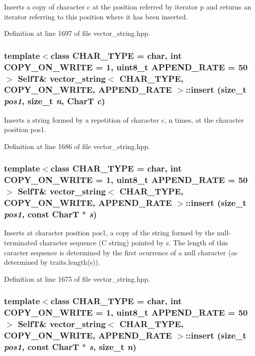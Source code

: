 Inserts a copy of character c at the position referred by iterator p and returns an iterator referring to this position where it has been inserted. 

Definition at line 1697 of file vector\_\-string.hpp.\hypertarget{classvector__string_c1a1bf0ea437e457a0b8a6ea543e5a7a}{
\subsubsection[{insert}]{\setlength{\rightskip}{0pt plus 5cm}template$<$class CHAR\_\-TYPE  = char, int COPY\_\-ON\_\-WRITE = 1, uint8\_\-t APPEND\_\-RATE = 50$>$ {\bf SelfT}\& {\bf vector\_\-string}$<$ CHAR\_\-TYPE, COPY\_\-ON\_\-WRITE, APPEND\_\-RATE $>$::insert (size\_\-t {\em pos1}, \/  size\_\-t {\em n}, \/  CharT {\em c})}}
\label{classvector__string_c1a1bf0ea437e457a0b8a6ea543e5a7a}


Inserts a string formed by a repetition of character c, n times, at the character position pos1. 

Definition at line 1686 of file vector\_\-string.hpp.\hypertarget{classvector__string_04f6c42efcbfd652e14268771f67df94}{
\subsubsection[{insert}]{\setlength{\rightskip}{0pt plus 5cm}template$<$class CHAR\_\-TYPE  = char, int COPY\_\-ON\_\-WRITE = 1, uint8\_\-t APPEND\_\-RATE = 50$>$ {\bf SelfT}\& {\bf vector\_\-string}$<$ CHAR\_\-TYPE, COPY\_\-ON\_\-WRITE, APPEND\_\-RATE $>$::insert (size\_\-t {\em pos1}, \/  const CharT $\ast$ {\em s})}}
\label{classvector__string_04f6c42efcbfd652e14268771f67df94}


Inserts at character position pos1, a copy of the string formed by the null-terminated character sequence (C string) pointed by s. The length of this caracter sequence is determined by the first ocurrence of a null character (as determined by traits.length(s)). 

Definition at line 1675 of file vector\_\-string.hpp.\hypertarget{classvector__string_74c7a4822a48e44db82676e5601d3afe}{
\subsubsection[{insert}]{\setlength{\rightskip}{0pt plus 5cm}template$<$class CHAR\_\-TYPE  = char, int COPY\_\-ON\_\-WRITE = 1, uint8\_\-t APPEND\_\-RATE = 50$>$ {\bf SelfT}\& {\bf vector\_\-string}$<$ CHAR\_\-TYPE, COPY\_\-ON\_\-WRITE, APPEND\_\-RATE $>$::insert (size\_\-t {\em pos1}, \/  const CharT $\ast$ {\em s}, \/  size\_\-t {\em n})}}
\label{classvector__string_74c7a4822a48e44db82676e5601d3afe}


